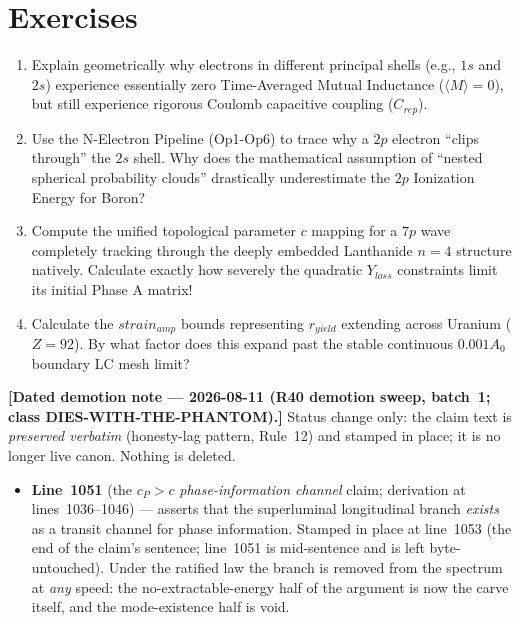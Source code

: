 \section*{Exercises}
\begin{enumerate}
    \item Explain geometrically why electrons in different principal shells (e.g., $1s$ and $2s$) experience essentially zero Time-Averaged Mutual Inductance ($\langle M \rangle = 0$), but still experience rigorous Coulomb capacitive coupling ($C_{rep}$).
    \item Use the N-Electron Pipeline (Op1-Op6) to trace why a $2p$ electron ``clips through'' the $2s$ shell. Why does the mathematical assumption of ``nested spherical probability clouds'' drastically underestimate the $2p$ Ionization Energy for Boron?
    \item Compute the unified topological parameter $c$ mapping for a $7p$ wave completely tracking through the deeply embedded Lanthanide $n=4$ structure natively. Calculate exactly how severely the quadratic $Y_{loss}$ constraints limit its initial Phase A matrix!
    \item Calculate the $strain_{amp}$ bounds representing $r_{yield}$ extending across Uranium ($Z=92$). By what factor does this expand past the stable continuous $0.001 A_0$ boundary LC mesh limit?
\end{enumerate}

\medskip
\noindent\textbf{[Dated demotion note --- 2026-08-11 (R40 demotion sweep, batch~1;
class DIES-WITH-THE-PHANTOM).]} Status change only: the claim text is \emph{preserved
verbatim} (honesty-lag pattern, Rule~12) and stamped in place; it is no longer live canon.
Nothing is deleted.

\begin{itemize}
  \item \textbf{Line~1051} (the $c_P > c$ \emph{phase-information channel} claim; derivation at lines~1036--1046) --- asserts that the superluminal longitudinal branch \emph{exists} as a transit channel for phase information. Stamped in place at line~1053 (the end of the claim's sentence; line~1051 is mid-sentence and is left byte-untouched). Under the ratified law the branch is removed from the spectrum at \emph{any} speed: the no-extractable-energy half of the argument is now the carve itself, and the mode-existence half is void.
\end{itemize}

